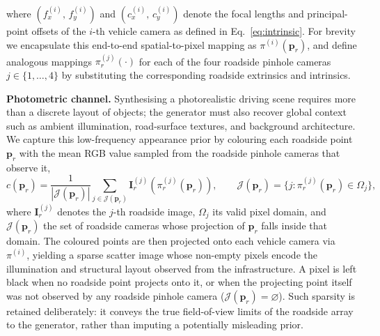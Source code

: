 %
where $(f_x^{(i)},\,f_y^{(i)})$ and $(c_x^{(i)},\,c_y^{(i)})$
denote the focal lengths and principal-point offsets of the
$i$-th vehicle camera as defined in Eq.~\eqref{eq:intrinsic}.
For brevity we encapsulate this end-to-end spatial-to-pixel
mapping as $\pi^{(i)}(\mathbf{p}_r)$, and define analogous
mappings $\pi_r^{(j)}(\cdot)$ for each of the four roadside
pinhole cameras $j\in\{1,\ldots,4\}$ by substituting the
corresponding roadside extrinsics and intrinsics.

\textbf{Photometric channel.}
Synthesising a photorealistic driving scene requires more
than a discrete layout of objects; the generator must also
recover global context such as ambient illumination,
road-surface textures, and background architecture. We
capture this low-frequency appearance prior by colouring each
roadside point $\mathbf{p}_r$ with the mean RGB value sampled
from the roadside pinhole cameras that observe it,
%
\begin{equation}
  \label{eq:blur}
  c(\mathbf{p}_r) = \frac{1}{|\mathcal{J}(\mathbf{p}_r)|}
  \sum_{j \in \mathcal{J}(\mathbf{p}_r)}
  \mathbf{I}_r^{(j)}\!\left(\pi_r^{(j)}(\mathbf{p}_r)\right),
  \qquad
  \mathcal{J}(\mathbf{p}_r) = \{j : \pi_r^{(j)}(\mathbf{p}_r) \in \Omega_j\},
\end{equation}
%
where $\mathbf{I}_r^{(j)}$ denotes the $j$-th roadside image,
$\Omega_j$ its valid pixel domain, and
$\mathcal{J}(\mathbf{p}_r)$ the set of roadside cameras whose
projection of $\mathbf{p}_r$ falls inside that domain. The
coloured points are then projected onto each vehicle camera
via $\pi^{(i)}$, yielding a sparse scatter image whose
non-empty pixels encode the illumination and structural
layout observed from the infrastructure. A pixel is left
black when no roadside point projects onto it, or when the
projecting point itself was not observed by any roadside
pinhole camera ($\mathcal{J}(\mathbf{p}_r)=\varnothing$).
Such sparsity is retained deliberately: it conveys the true
field-of-view limits of the roadside array to the generator,
rather than imputing a potentially misleading prior.

